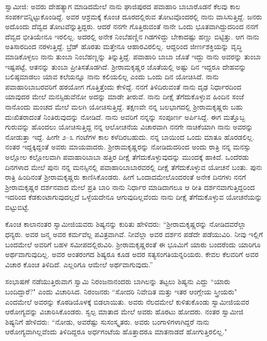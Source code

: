 ಸ್ವಾಮೀಜಿ: ಅವರು ದೇಹತ್ಯಾಗ ಮಾಡಿದಮೇಲೆ ನಾನು ಘಾಜಿಪುರದ ಪವಾಹಾರಿ ಬಾಬಾರೊಡನೆ ಕೆಲವು ಕಾಲ ಸಂಪರ್ಕವನ್ನಿಟ್ಟುಕೊಂಡಿದ್ದೆ. ಅವರ ಆಶ್ರಮಕ್ಕೆ ಕೊಂಚ ದೂರದಲ್ಲಿರುವ ತೋಟವೊಂದರಲ್ಲಿ ನಾನು ವಾಸಿಸುತ್ತಿದ್ದೆ. ಜನರು ಅದೊಂದು ದೆವ್ವದ ತೋಟವೆನ್ನುತ್ತಿದ್ದರು. ಆದರೆ ನನಗೇ ಗೊತ್ತಿರುವಂತೆ ನಾನೇ ಒಂದು ಭೂತವಾಗಿದ್ದುದರಿಂದ ನನಗೆ ದೆವ್ವದ ಭೀತಿಯೇನೂ ಇರಲಿಲ್ಲ. ಅದರಲ್ಲಿ ಅನೇಕ ನಿಂಬೆಹಣ್ಣಿನ ಗಿಡಗಳಿದ್ದು ಬೇಕಾದಷ್ಟು ಹಣ್ಣು ಬಿಟ್ಟಿತ್ತು. ಆಗ ನಾನು ಅತಿಸಾರದಿಂದ ನರಳುತ್ತಿದ್ದೆ. ಬ್ರೆಡ್ ಹೊರತು ಮತ್ತೇನೂ ಆಹಾರವಿರಲಿಲ್ಲ. ಆದ್ದರಿಂದ ಜೀರ್ಣಶಕ್ತಿಯನ್ನು ವೃದ್ಧಿ ಮಾಡಿಕೊಳ್ಳಲು ನಾನು ತುಂಬಾ ನಿಂಬೆಹಣ್ಣನ್ನು ತಿನ್ನುತ್ತಿದ್ದೆ. ಪವಾಹಾರಿ ಬಾಬಾ ಜೊತೆ ಇದ್ದು ನಾನು ಅವರನ್ನು ತುಂಬಾ ಇಷ್ಟಪಟ್ಟೆ, ಆತನನ್ನು ತುಂಬಾ ಪ್ರೀತಿಸತೊಡಗಿದೆ. ಶ‍್ರೀರಾಮಕೃಷ್ಣರ ಜೊತೆಯಲ್ಲಿ ಅಷ್ಟು ದಿನ ಇದ್ದರೂ ದೇಹವನ್ನು ಬಲಿಷ್ಠಮಾಡಲು ಯಾವ ಕಲೆಯನ್ನೂ ನಾನು ಕಲಿಯಲಿಲ್ಲ ಎಂದು ಒಂದು ದಿನ ಯೋಚಿಸಿದೆ. ನಾನು ಪವಾಹಾರಿಬಾಬರವರಿಗೆ ಹಠಯೋಗ ಗೊತ್ತಿತ್ತೆಂದು ಕೇಳಿದ್ದೆ. ನನಗೆ ತಿಳಿದಿರುವಂತೆ ನಾನು ದೃಢ ನಿರ್ಧಾರದಿಂದ ಯಾವುದರ ಮೇಲೆ ಮನಸ್ಸಿಡುವೆನೋ ಅದನ್ನು ಮಾಡೇ ತೀರುವೆ. ನಾನು ದೀಕ್ಷೆ ತೆಗೆದುಕೊಳ್ಳುವ ಹಿಂದಿನ ಸಂಜೆ ನಾನೊಂದು ಮಂಚದ ಮೇಲೆ ಮಲಗಿ ಯೋಚಿಸುತ್ತಿದ್ದೆ. ತಕ್ಷಣವೇ ನನ್ನ ಬಲಭಾಗದಲ್ಲಿ ಶ‍್ರೀರಾಮಕೃಷ್ಣರು ಬಹು ದುಃಖಿತರಾದಂತೆ ನಿಂತಿರುವುದನ್ನು ನೋಡಿದೆ. ನಾನು ಅವರಿಗೆ ನನ್ನನ್ನು ಸಂಪೂರ್ಣ ಅರ್ಪಿಸಿದ್ದೆ. ಈಗ ಮತ್ತೊಬ್ಬ ಗುರುವನ್ನು ಹೊಂದಲು ಯೋಚಿಸುತ್ತಿದ್ದ ನನ್ನ ಆಲೋಚನೆಯ ವಿಚಾರವಾಗಿ ನನಗೇ ನಾಚಿಕೆಯಾಗಿ ನಾನು ಅವರನ್ನು ನೋಡುತ್ತಾ ಇದ್ದೆ. ಹೀಗೇ ೨–೩ ಗಂಟೆಗಳ ಕಾಲ ಕಳೆದಿರಬಹುದು. ನನ್ನ ಬಾಯಿಂದ ಒಂದು ಮಾತೂ ಹೊರಡಲಿಲ್ಲ. ನಂತರ ಇದ್ದಕ್ಕಿದ್ದಂತೆ ಅವರು ಮಾಯವಾದರು. ಶ‍್ರೀರಾಮಕೃಷ್ಣರನ್ನು ನೋಡಿದುದರಿಂದ ಅಂದು ರಾತ್ರಿ ನನ್ನ ಮನಸ್ಸು ಅಲ್ಲೋಲ ಕಲ್ಲೋಲವಾಗಿ ಪವಾಹಾರಿಬಾಬಾ ಹತ್ತಿರ ದೀಕ್ಷೆ ತೆಗೆದುಕೊಳ್ಳುವುದನ್ನು ಮುಂದಕ್ಕೆ ಹಾಕಿದೆ. ಒಂದೆರಡು ದಿನಗಳಾದ ಮೇಲೆ ಪುನಃ ನನ್ನ ಮನಸ್ಸಿನಲ್ಲಿ ಪವಾಹಾರಿಬಾಬಾರವರಲ್ಲಿ ದೀಕ್ಷೆ ತೆಗೆದುಕೊಳ್ಳುವ ಯೋಚನೆ ಬಂತು. ಪುನಃ ರಾತ್ರಿ ಹಿಂದಿನಂತೆ ಶ‍್ರೀರಾಮಕೃಷ್ಣರು ಕಾಣಿಸಿಕೊಂಡರು. ಹೀಗೆ ಒಂದಾದಮೇಲೊಂದರಂತೆ ಅನೇಕ ದಿನಗಳು ನನಗೆ ಶ‍್ರೀರಾಮಕೃಷ್ಣರ ದರ್ಶನವಾದ ಮೇಲೆ ಪ್ರತಿ ಬಾರಿ ನಾನು ನಿರ್ಧಾರ ಮಾಡಿದಾಗಲೂ ಆ ರೀತಿ ದರ್ಶನವಾಗುತ್ತಿದ್ದರಿಂದ ಇದರಿಂದ ಕೆಡಕುಂಟಾಗುವುದಲ್ಲದೆ ಒಳ್ಳೆಯದೇನೂ ಆಗುವುದಿಲ್ಲವೆಂದು ನಾನು ದೀಕ್ಷೆ ತೆಗೆದುಕೊಳ್ಳುವ ಯೋಚನೆಯನ್ನು ಬಿಟ್ಟುಬಿಟ್ಟೆ.

ಕೊಂಚ ಕಾಲಾನಂತರ ಸ್ವಾಮೀಜಿಯವರು ಶಿಷ್ಯನನ್ನು ಕುರಿತು ಹೇಳಿದರು: “ಶ‍್ರೀರಾಮಕೃಷ್ಣರನ್ನು ನೋಡಿದವರೆಲ್ಲಾ ಧನ್ಯರು. ಅವರ ಜನ್ಮ ಅವರ ಕರ್ಮವೆಲ್ಲ ಪವಿತ್ರವಾಗಿವೆ. ನೀವೆಲ್ಲಾ ಅವರ ದರ್ಶನ ಪಡೆದೇ ಪಡೆಯುವಿರಿ. ನೀವು ಇಲ್ಲಿಗೆ ಬಂದಮೇಲೆ ಅವರಿಗೆ ಬಹಳ ಸಮೀಪದಲ್ಲಿರುವಿರಿ. ಶ‍್ರೀರಾಮಕೃಷ್ಣರಂತೆ ಈ ಭೂಮಿಗೆ ಯಾರು ಬಂದರೆಂದು ಯಾರಿಗೂ ಅರ್ಥವಾಗುವುದಿಲ್ಲ. ಅವರ ಅಂತರಂಗದ ಶಿಷ್ಯರೂ ಕೂಡ ಅದರ ಸತ್ಯಸಂಗತಿಯನ್ನರಿಯರು. ಕೇವಲ ಕೆಲವರಿಗೆ ಅವರ ವಿಚಾರ ಕೊಂಚ ತಿಳಿದಿದೆ. ಎಲ್ಲರಿಗೂ ಆಮೇಲೆ ಅರ್ಥವಾಗುವುದು.”

ಸಂಭಾಷಣೆ ನಡೆಯುತ್ತಿರುವಾಗ ಸ್ವಾಮಿ ನಿರಂಜನಾನಂದರು ಬಾಗಿಲನ್ನು ತಟ್ಟಲು ಶಿಷ್ಯನು ಎದ್ದು “ಯಾರು ಬಂದಿದ್ದಾರೆ?" ಎಂದು ವಿಚಾರಿಸಿದ. ನಿರಂಜನರು “ಸೋದರಿ ನಿವೇದಿತ ಮತ್ತು ಇತರ ಆಂಗ್ಲೇಯ ಸ್ತ್ರೀಯರು" ಎಂದಮೇಲೆ ಅವರನ್ನು ಕೊಠಡಿಯೊಳಕ್ಕೆ ಬಿಡಲಾಯಿತು. ಅವರು ನೆಲದಮೇಲೆ ಕುಳಿತುಕೊಂಡು ಸ್ವಾಮೀಜಿಯವರ ಆರೋಗ್ಯವನ್ನು ವಿಚಾರಿಸಿಕೊಂಡರು. ಸ್ವಲ್ಪ ಮಾತಾದ ಮೇಲೆ ಅವರು ಹೊರಟು ಹೋದರು. ನಂತರ ಸ್ವಾಮೀಜಿ ಶಿಷ್ಯನಿಗೆ ಹೇಳಿದರು: “ನೋಡು, ಅವರೆಷ್ಟು ಸುಸಂಸ್ಕೃತರು. ಅವರು ಬಂಗಾಳಿಗಳಾಗಿದ್ದರೆ ನಾನು ಆರೋಗ್ಯವಾಗಿಲ್ಲವೆಂದು ತಿಳಿದಿದ್ದರೂ ಅರ್ಧಗಂಟೆಯ ಹೊತ್ತಾದರೂ ಮಾತನಾಡದೆ ಹೋಗುತ್ತಿರಲಿಲ್ಲ."

